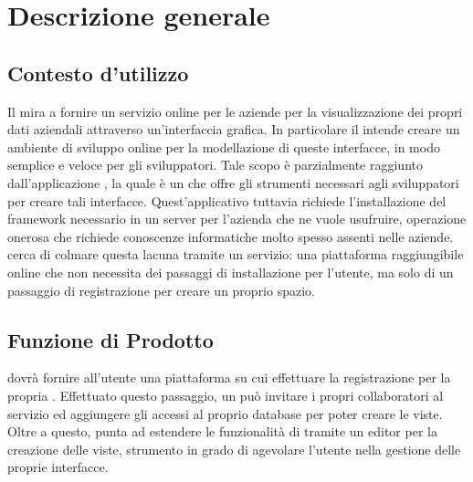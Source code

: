 \section{Descrizione generale}
\subsection{Contesto d'utilizzo}
Il   mira a fornire un servizio online per le aziende per la visualizzazione dei propri dati aziendali attraverso un'interfaccia grafica. In particolare il  intende creare un ambiente di sviluppo online per la modellazione di queste interfacce, in modo semplice e veloce per gli sviluppatori.
Tale scopo è parzialmente raggiunto dall'applicazione , la quale è un  che offre gli strumenti necessari agli sviluppatori per creare tali interfacce. Quest'applicativo tuttavia richiede l'installazione del framework necessario in un server per l'azienda che ne vuole usufruire, operazione onerosa che richiede conoscenze informatiche molto spesso assenti nelle aziende.  cerca di colmare questa lacuna tramite un servizio: una piattaforma raggiungibile online che non necessita dei passaggi di installazione per l'utente, ma solo di un passaggio di registrazione per creare un proprio spazio.

\subsection{Funzione di Prodotto}
 dovrà fornire all'utente una piattaforma su cui effettuare la registrazione per la propria . Effettuato questo passaggio, un  pu\`o invitare i propri collaboratori al servizio ed aggiungere gli accessi al proprio database  per poter creare le viste.
Oltre a questo,  punta ad estendere le funzionalità di  tramite un editor per la creazione delle viste, strumento in grado di agevolare l'utente nella gestione delle proprie interfacce.


